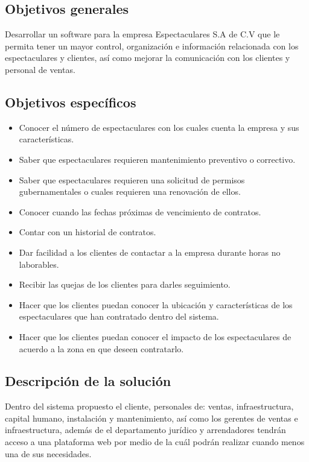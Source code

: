 \subsection{Objetivos generales}

Desarrollar un software para la empresa Espectaculares S.A de C.V que le permita tener un mayor control, organización e información relacionada con los espectaculares y clientes, así como mejorar la comunicación con los clientes y personal de ventas.

\subsection{Objetivos específicos}%

\begin{itemize}
    \item Conocer el número de espectaculares con los cuales cuenta la empresa y sus características.
    \item Saber que espectaculares requieren mantenimiento preventivo o correctivo.
    \item Saber que espectaculares requieren una solicitud de permisos gubernamentales o cuales requieren una renovación de ellos.
    \item Conocer cuando las fechas próximas de vencimiento de contratos.
    \item Contar con un historial de contratos.
    \item Dar facilidad a los clientes de contactar a la empresa durante horas no laborables.
    \item Recibir las quejas de los clientes para darles seguimiento.
    \item Hacer que los clientes puedan conocer la ubicación y características de los espectaculares que han contratado dentro del sistema.
    \item Hacer que los clientes puedan conocer el impacto de los espectaculares de acuerdo a la zona en que deseen contratarlo.
\end{itemize}

\subsection{Descripción de la solución}
Dentro del sistema propuesto el cliente, personales de: ventas, infraestructura, capital humano, instalación y mantenimiento, así como los gerentes de ventas e infraestructura, además de el departamento jurídico y arrendadores tendrán acceso a una plataforma web por medio de la cuál podrán realizar cuando menos una de sus necesidades.\\

